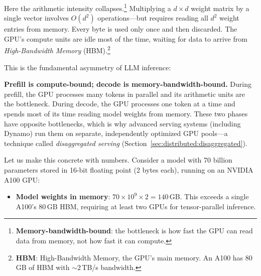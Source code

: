 Here the arithmetic intensity collapses.\footnote{\textbf{Memory-bandwidth-bound}: the bottleneck is how fast the GPU can read data from memory, not how fast it can compute.} Multiplying a $d \times d$ weight matrix by a single vector involves $O(d^2)$ operations---but requires reading all $d^2$ weight entries from memory. Every byte is used only once and then discarded. The GPU's compute units are idle most of the time, waiting for data to arrive from \emph{High-Bandwidth Memory} (HBM).\footnote{\textbf{HBM}: High-Bandwidth Memory, the GPU's main memory. An A100 has 80\,GB of HBM with ${\sim}2$\,TB/s bandwidth.}

This is the fundamental asymmetry of LLM inference:

\begin{insightbox}
\textbf{Prefill is compute-bound; decode is memory-bandwidth-bound.} During prefill, the GPU processes many tokens in parallel and its arithmetic units are the bottleneck. During decode, the GPU processes one token at a time and spends most of its time reading model weights from memory. These two phases have opposite bottlenecks, which is why advanced serving systems (including Dynamo) run them on separate, independently optimized GPU pools---a technique called \emph{disaggregated serving} (Section~\ref{sec:distributed:disaggregated}).
\end{insightbox}

Let us make this concrete with numbers. Consider a model with 70 billion parameters stored in 16-bit floating point (2 bytes each), running on an NVIDIA A100 GPU:
\begin{itemize}
    \item \textbf{Model weights in memory}: $70 \times 10^9 \times 2 = 140$\,GB. This exceeds a single A100's 80\,GB HBM, requiring at least two GPUs for tensor-parallel inference.
\end{itemize}

